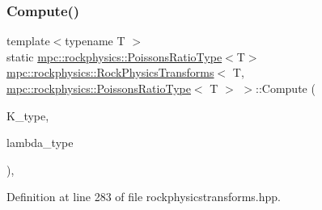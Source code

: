 \subsubsection{\texorpdfstring{Compute()}{Compute()}\hspace{0.1cm}{\footnotesize\ttfamily [2/6]}}
{\footnotesize\ttfamily template$<$typename T $>$ \\
static \mbox{\hyperlink{structmpc_1_1rockphysics_1_1_poissons_ratio_type}{mpc\+::rockphysics\+::\+Poissons\+Ratio\+Type}}$<$T$>$ \mbox{\hyperlink{structmpc_1_1rockphysics_1_1_rock_physics_transforms}{mpc\+::rockphysics\+::\+Rock\+Physics\+Transforms}}$<$ T, \mbox{\hyperlink{structmpc_1_1rockphysics_1_1_poissons_ratio_type}{mpc\+::rockphysics\+::\+Poissons\+Ratio\+Type}}$<$ T $>$ $>$\+::Compute (\begin{DoxyParamCaption}\item[{const \mbox{\hyperlink{structmpc_1_1rockphysics_1_1_bulk_modulus_type}{mpc\+::rockphysics\+::\+Bulk\+Modulus\+Type}}$<$ T $>$ \&}]{K\+\_\+type,  }\item[{const \mbox{\hyperlink{structmpc_1_1rockphysics_1_1_lame_paramter_modulus_type}{mpc\+::rockphysics\+::\+Lame\+Paramter\+Modulus\+Type}}$<$ T $>$ \&}]{lambda\+\_\+type }\end{DoxyParamCaption})\hspace{0.3cm}{\ttfamily [inline]}, {\ttfamily [static]}}



Definition at line 283 of file rockphysicstransforms.\+hpp.

\mbox{\label{structmpc_1_1rockphysics_1_1_rock_physics_transforms_3_01_t_00_01mpc_1_1rockphysics_1_1_poissons_ratio_type_3_01_t_01_4_01_4_a486cac3834e73fb0836d1a904867e943}} 
